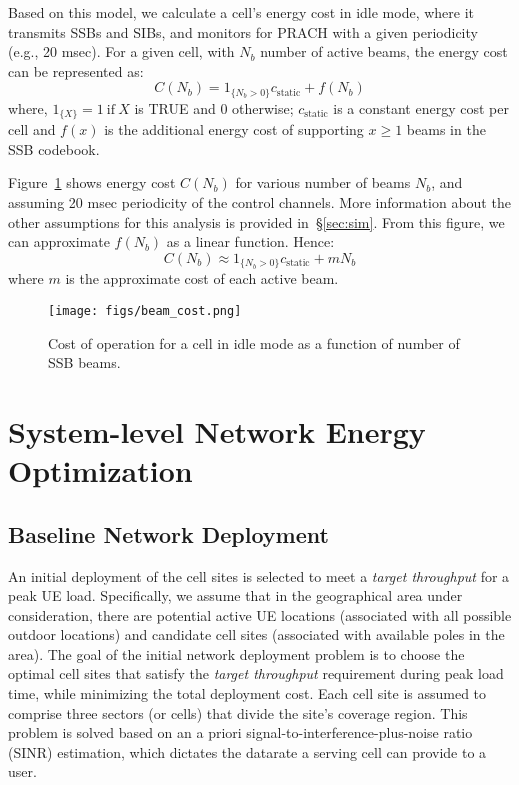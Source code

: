 Based on this model, we calculate a cell's energy cost in idle mode, where it transmits SSBs and SIBs, and monitors for PRACH with a given periodicity (e.g., 20 msec).
For a given cell, with $N_b$ number of active beams, the energy cost can be represented as:
\begin{equation}\label{eq:cell_opex}
    C(N_b) = 1_{\{N_b>0\}}c_{\textrm{static}} + f(N_b)
\end{equation}
where, $1_{\{X\}} = 1 ~\textrm{if}~ X$ is TRUE and $0$ otherwise; $c_{\textrm{static}}$ is a constant energy cost per cell and $f(x)$ is the additional energy cost of supporting $x \ge 1$ beams in the SSB codebook.

Figure~\ref{fig:sample_ssb_period} shows energy cost $C(N_b)$ for various number of beams $N_b$, and assuming 20 msec periodicity of the control channels. 
More information about the other assumptions for this analysis is provided in~\S\ref{sec:sim}.
From this figure, we can approximate $f(N_b)$ as a linear function. Hence:
\begin{equation}\label{eq:cell_opex_approx}
    C(N_b) \approx 1_{\{N_b>0\}}c_{\textrm{static}} + mN_b
\end{equation}
where $m$ is the approximate cost of each active beam.

\begin{figure}
\centering
\texttt{[image: figs/beam\_cost.png]}
\caption{Cost of operation for a cell in idle mode as a function of number of SSB beams.}
    \label{fig:sample_ssb_period}
    \vspace{-20pt}
\end{figure}


\section{System-level Network Energy Optimization}
\label{sec:system}

\subsection{Baseline Network Deployment}
An initial deployment of the cell sites is selected to meet a \textit{target throughput} for a peak UE load.
Specifically, we assume that in the geographical area under consideration, there are potential active UE locations (associated with all possible outdoor locations) 
and candidate cell sites (associated with available poles in the area). 
The goal of the initial network deployment problem is to choose the optimal cell sites 
that satisfy the \textit{target throughput} requirement during peak load time, while minimizing the total deployment cost. 
Each cell site is assumed to comprise three sectors (or cells) that divide the site's coverage region. 
This problem is solved based on an a priori signal-to-interference-plus-noise ratio (SINR) estimation, which dictates the datarate a serving cell can provide to a user. %

